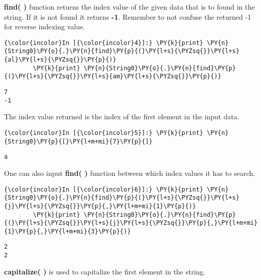     \textbf{find( )} function returns the index value of the given data that
is to found in the string. If it is not found it returns \textbf{-1}.
Remember to not confuse the returned -1 for reverse indexing value.

    \begin{Verbatim}[commandchars=\\\{\}]
{\color{incolor}In [{\color{incolor}4}]:} \PY{k}{print} \PY{n}{String0}\PY{o}{.}\PY{n}{find}\PY{p}{(}\PY{l+s}{\PYZsq{}}\PY{l+s}{al}\PY{l+s}{\PYZsq{}}\PY{p}{)}
        \PY{k}{print} \PY{n}{String0}\PY{o}{.}\PY{n}{find}\PY{p}{(}\PY{l+s}{\PYZsq{}}\PY{l+s}{am}\PY{l+s}{\PYZsq{}}\PY{p}{)}
\end{Verbatim}

    \begin{Verbatim}[commandchars=\\\{\}]
7
-1
    \end{Verbatim}

    The index value returned is the index of the first element in the input
data.

    \begin{Verbatim}[commandchars=\\\{\}]
{\color{incolor}In [{\color{incolor}5}]:} \PY{k}{print} \PY{n}{String0}\PY{p}{[}\PY{l+m+mi}{7}\PY{p}{]}
\end{Verbatim}

    \begin{Verbatim}[commandchars=\\\{\}]
a
    \end{Verbatim}

    One can also input \textbf{find( )} function between which index values
it has to search.

    \begin{Verbatim}[commandchars=\\\{\}]
{\color{incolor}In [{\color{incolor}6}]:} \PY{k}{print} \PY{n}{String0}\PY{o}{.}\PY{n}{find}\PY{p}{(}\PY{l+s}{\PYZsq{}}\PY{l+s}{j}\PY{l+s}{\PYZsq{}}\PY{p}{,}\PY{l+m+mi}{1}\PY{p}{)}
        \PY{k}{print} \PY{n}{String0}\PY{o}{.}\PY{n}{find}\PY{p}{(}\PY{l+s}{\PYZsq{}}\PY{l+s}{j}\PY{l+s}{\PYZsq{}}\PY{p}{,}\PY{l+m+mi}{1}\PY{p}{,}\PY{l+m+mi}{3}\PY{p}{)}
\end{Verbatim}

    \begin{Verbatim}[commandchars=\\\{\}]
2
2
    \end{Verbatim}

    \textbf{capitalize( )} is used to capitalize the first element in the
string.


